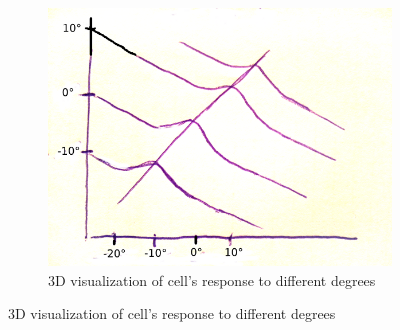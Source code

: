 \documentclass[a4paper, 12pt]{article}
\begin{document}
\begin{figure}[H]
\begin{subfigure}[b]{0.3\textwidth}
		\centering
		\includegraphics[width=\textwidth]{3D-visualisation.png}
		\caption{3D visualization of cell's response to different degrees}
	\end{subfigure}
\end{figure}
\end{document}

